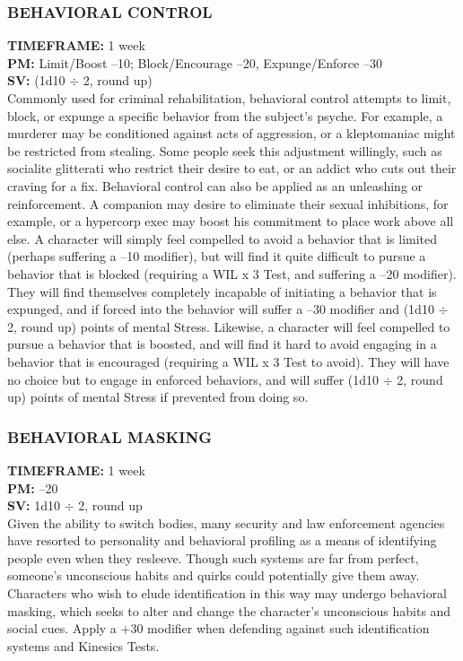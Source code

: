 \subsubsection{BEHAVIORAL CONTROL}
\textbf{TIMEFRAME:} 1 week \\
\textbf{PM:} Limit/Boost –10; Block/Encourage –20, Expunge/Enforce –30 \\
\textbf{SV:} (1d10 $\div$ 2, round up) \\
Commonly used for criminal rehabilitation, behavioral
control attempts to limit, block, or expunge a
specific behavior from the subject’s psyche. For example,
a murderer may be conditioned against acts of aggression,
or a kleptomaniac might be restricted from
stealing. Some people seek this adjustment willingly,
such as socialite glitterati who restrict their desire to
eat, or an addict who cuts out their craving for a fix.
Behavioral control can also be applied as an unleashing
or reinforcement. A companion may desire
to eliminate their sexual inhibitions, for example, or
a hypercorp exec may boost his commitment to place
work above all else.
A character will simply feel compelled to avoid
a behavior that is limited (perhaps suffering a –10
modifier), but will find it quite difficult to pursue a behavior
that is blocked (requiring a WIL x 3 Test, and
suffering a –20 modifier). They will find themselves
completely incapable of initiating a behavior that is
expunged, and if forced into the behavior will suffer
a –30 modifier and (1d10 $\div$ 2, round up) points of
mental Stress.
Likewise, a character will feel compelled to pursue a
behavior that is boosted, and will find it hard to avoid
engaging in a behavior that is encouraged (requiring a
WIL x 3 Test to avoid). They will have no choice but
to engage in enforced behaviors, and will suffer (1d10
$\div$ 2, round up) points of mental Stress if prevented
from doing so.

\subsubsection{BEHAVIORAL MASKING}
\textbf{TIMEFRAME:} 1 week \\
\textbf{PM:} –20 \\
\textbf{SV:} 1d10 $\div$ 2, round up \\
Given the ability to switch bodies, many security and
law enforcement agencies have resorted to personality
and behavioral profiling as a means of identifying
people even when they resleeve. Though such systems
are far from perfect, someone’s unconscious habits
and quirks could potentially give them away. Characters
who wish to elude identification in this way may
undergo behavioral masking, which seeks to alter and
change the character’s unconscious habits and social
cues. Apply a +30 modifier when defending against
such identification systems and Kinesics Tests.

